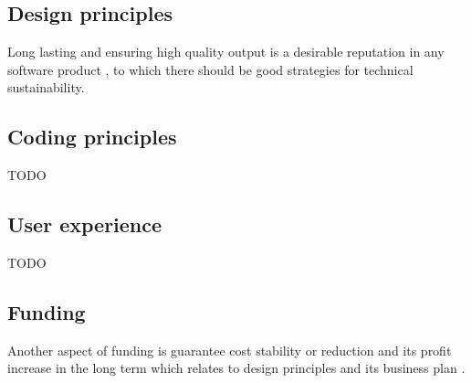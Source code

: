 \documentclass{article}
\begin{document}
\subsection{Design principles}
Long lasting and ensuring high quality output is a desirable reputation in any software product \cite{imran2019software}, to which there should be good strategies for technical sustainability.





\subsection{Coding principles}
TODO


\subsection{User experience}
TODO


\subsection{Funding}
Another aspect of funding is guarantee cost stability or reduction and its profit increase in the long term which relates to design principles and its business plan \cite{imran2019software}.

\end{document}
